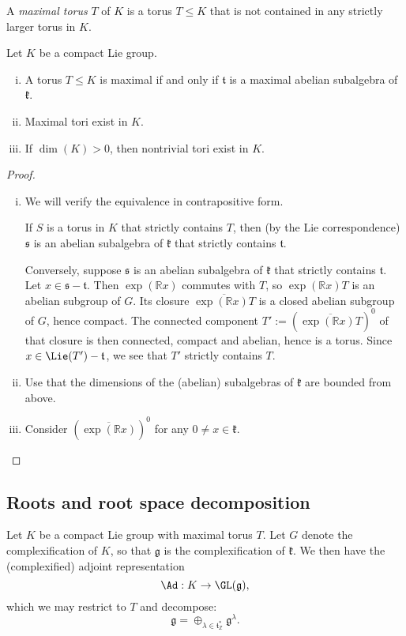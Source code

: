 \documentclass[reqno]{amsart} 
\begin{document}
\begin{definition}
  A \emph{maximal torus} $T$ of $K$ is a torus $T \leq K$ that is not contained in any strictly larger torus in $K$.
\end{definition}

\begin{lemma}\label{lem:maximal-tori-vs-maxl-ab-subalg}
  Let $K$ be a compact Lie group.
  \begin{enumerate}
[(i)]
  \item A torus $T \leq K$ is maximal if and only if $\mathfrak{t}$ is a maximal abelian subalgebra of $\mathfrak{k}$.
  \item Maximal tori exist in $K$.
  \item If $\dim(K) > 0$, then nontrivial tori exist in $K$. \label{item:existence-nontrivial-tori}
  \end{enumerate}
\end{lemma}
\begin{proof}
  \begin{enumerate}
[(i)]
  \item We will verify the equivalence in contrapositive form.
    
    If $S$ is a torus in $K$ that strictly contains $T$, then (by the Lie correspondence) $\mathfrak{s}$ is an abelian subalgebra of $\mathfrak{k}$ that strictly contains $\mathfrak{t}$.

    Conversely, suppose $\mathfrak{s}$ is an abelian subalgebra of $\mathfrak{k}$ that strictly contains $\mathfrak{t}$.  Let $x \in \mathfrak{s} - \mathfrak{t}$.  Then $\exp(\mathbb{R} x)$ commutes with $T$, so $\exp(\mathbb{R} x) T$ is an abelian subgroup of $G$.  Its closure $\overline{\exp(\mathbb{R} x) T}$ is a closed abelian subgroup of $G$, hence compact.  The connected component $T' := (\overline{\exp(\mathbb{R} x) T})^0$ of that closure is then connected, compact and abelian, hence is a torus.  Since $x \in \Lie(T') - \mathfrak{t}$, we see that $T'$ strictly contains $T$.
  \item Use that the dimensions of the (abelian) subalgebras of $\mathfrak{k}$ are bounded from above.
  \item Consider $(\overline{\exp(\mathbb{R} x)})^0$ for any $0 \neq x \in \mathfrak{k}$.
  \end{enumerate}
\end{proof}

\subsection{Roots and root space decomposition}
Let $K$ be a compact Lie group with maximal torus $T$.  Let $G$ denote the complexification of $K$, so that $\mathfrak{g}$ is the complexification of $\mathfrak{k}$.  We then have the (complexified) adjoint representation
\begin{equation*}
  \Ad : K \rightarrow \GL(\mathfrak{g}),
\end{equation*}
which we may restrict to $T$ and decompose:
\begin{equation}\label{eq:decmopose-Ad-g-into-weightspaces}
  \mathfrak{g} =
  \oplus_{\lambda \in \mathfrak{t}_{\mathbb{Z}}^*}
  \mathfrak{g}^{\lambda}.
\end{equation}
\end{document}
